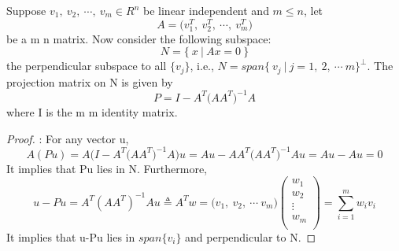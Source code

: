 \begin{lem}
Suppose $v_1,\ v_2,\ \cdots,\ v_m \in R^n$ be linear independent and $m \leq n$, let \[A = \bigl(v_1^T,\ v_2^T,\ \cdots,\ v_m^T\bigr)\] be a m \texttimes n matrix. Now consider the following subspace: \[N = \bigl\{\ x\ |\ Ax=0\ \bigr\}\] the perpendicular subspace to all $\bigl\{v_j\bigr\}$, i.e., \(N = span\bigl\{\ v_j\ |\ j=1,\ 2,\ \cdots\ m\bigr\}^\bot\). The projection matrix on N is given by
\[P = I - A^T\bigl(AA^T\bigr)^{-1}A\]
where I is the m \texttimes m identity matrix.
\end{lem}
\begin{proof}: For any vector u, 
\[A(Pu) = A\bigl(I - A^T\bigl(AA^T\bigr)^{-1}A\bigr)u = Au - AA^T\bigl(AA^T\bigr)^{-1}Au 
= Au - Au = 0\]
It implies that Pu lies in N. Furthermore, 
\[ u-Pu = A^T\left(AA^T\right)^{-1}Au \triangleq A^Tw = \bigl(v_1,\ v_2,\ \cdots\ v_m\bigr)
\left( \begin{array}{c} w_1\\ w_2\\ \vdots\\ w_m\\ \end{array} \right)
=\sum_{i=1}^m w_iv_i\]
It implies that u-Pu lies in $span\bigl\{v_i\bigr\}$ and perpendicular to N.
\end{proof}

